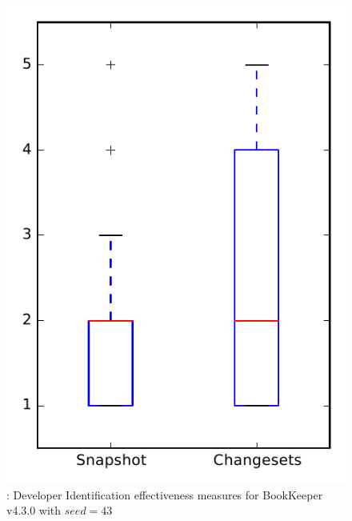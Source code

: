 
\begin{figure}
\centering
\includegraphics[height=0.4\textheight]{figures/dit_seed/rq1_bookkeeper_43}
\caption{\rtwo: Developer Identification effectiveness measures for BookKeeper v4.3.0 with $seed=43$}
\label{fig:dit_seed:rq1:bookkeeper}
\end{figure}
